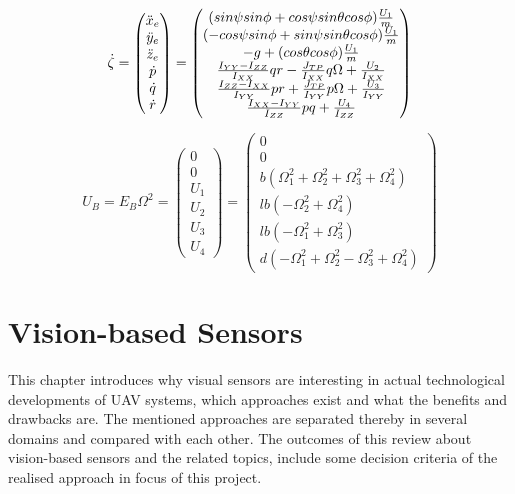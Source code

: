 \begin{equation}
\label{formula:dot_zeta}
\linespread{0,8}
\ensuremath{\dot\zeta} = \begin{pmatrix} \ddot x_e \\ \ddot y_e \\ \ddot
z_e \\ \dot p \\ \dot q \\ \dot r \\\end{pmatrix}
=
\begin{pmatrix}
  (sin\psi sin\phi
  +cos\psi sin\theta cos\phi)\frac{U_1}{m} \\
  (-cos\psi sin\phi + sin\psi sin\theta cos\phi)\frac{U_1}{m} \\
  -g+(cos\theta cos\phi)\frac{U_1}{m} \\

  \frac{I_{YY}-I_{ZZ}}{I_{XX}}qr -\frac{J_{TP}}{I_{XX}}q\Omega+\frac{U_2}{I_{XX}}\\

  \frac{I_{ZZ}-I_{XX}}{I_{YY}}pr +\frac{J_{TP}}{I_{YY}}p\Omega+\frac{U_3}{I_{YY}} \\

   \frac{I_{XX}-I_{YY}}{I_{ZZ}}pq+\frac{U_4}{I_{ZZ}} \\
\end{pmatrix}
\end{equation} 

\begin{equation}
\label{formula:EB_Omega2}
U_B=E_B\Omega^2=
\begin{pmatrix} 0\\ 0\\ U_1 \\ U_2 \\ U_3 \\ U_4\end{pmatrix}=
\begin{pmatrix}
0\\
0\\
b(\Omega_1^2+\Omega_2^2+\Omega_3^2+\Omega_4^2) \\
l b(-\Omega_2^2+\Omega_4^2) \\
l b(-\Omega_1^2+\Omega_3^2) \\
d(-\Omega_1^2+\Omega_2^2-\Omega_3^2+\Omega_4^2)
\end{pmatrix}
\end{equation}
\section{Vision-based Sensors} %
This chapter introduces why visual sensors are interesting in actual technological developments of \gls{UAV} systems, which approaches exist and what the benefits and drawbacks are. The mentioned approaches are separated thereby in several domains and compared with each other.
The outcomes of this review about vision-based sensors and the related topics, include some decision criteria of the realised approach in focus of this project.
  

